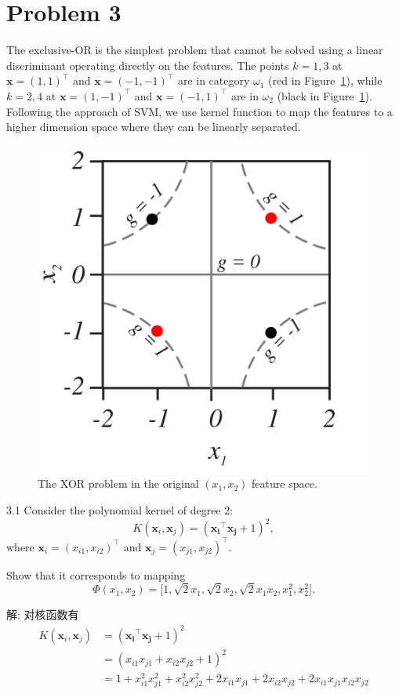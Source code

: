 \documentclass{article}
\begin{document}
\section*{Problem 3}
The exclusive-OR is the simplest problem that cannot be solved using a linear discriminant operating directly on the features. The points $k=1,3$ at $\bm{x}=(1,1)^{\top}$ and $\bm{x}=(-1,-1)^{\top}$ are in category $\omega_1$ (red in Figure~\ref{fig:xor}), while $k=2,4$ at $\bm{x}=(1,-1)^{\top}$ and $\bm{x}=(-1,1)^{\top}$ are in $\omega_2$ (black in Figure~\ref{fig:xor}). Following the approach of SVM, we use kernel function to map the features to a higher dimension space where they can be linearly separated.

\begin{figure}[htbp]
    \centering
    \includegraphics[width=0.3\linewidth]{XOR.PNG}
    \caption{The XOR problem in the original $(x_1,x_2)$ feature space.}
    \label{fig:xor}
\end{figure}

3.1 Consider the polynomial kernel of degree 2: 
\begin{equation}
  K(\bm{x}_i,\bm{x}_j) = (\bm{x_i}^{\top}\bm{x_j}+1)^2,
\end{equation}
where $\bm{x}_i = (x_{i1}, x_{i2})^{\top}$ and $\bm{x}_j=(x_{j1}, x_{j2})^{\top}$.

Show that it corresponds to mapping 
\begin{equation}
  \Phi(x_1, x_2) = \Big[1, \sqrt{2}x_1, \sqrt{2}x_2, \sqrt{2}x_1x_2, x_1^2, x_2^2\Big].
\end{equation}

解: 对核函数有
\begin{equation}
  \begin{aligned}
    K(\bm{x}_i,\bm{x}_j)
      &=(\bm{x_i}^{\top}\bm{x_j}+1)^2\\
      &=(x_{i1}x_{j1}+x_{i2}x_{j2}+1)^2\\
      &=1+x_{i1}^2x_{j1}^2+x_{i2}^2x_{j2}^2+2x_{i1}x_{j1}+2x_{i2}x_{j2}+2x_{i1}x_{j1}x_{i2}x_{j2}\\
  \end{aligned}
\end{equation}
\end{document}
